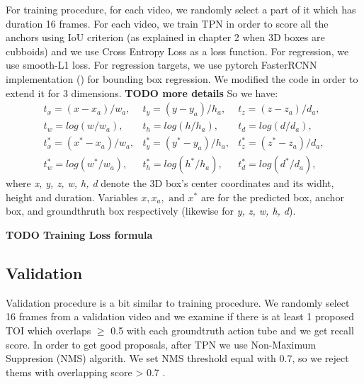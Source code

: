 \documentclass{report}
\begin{document}
For training procedure, for each video, we randomly select a part of it which has duration 16 frames. For each video, we train TPN in
order to score all the anchors using IoU criterion (as explained in chapter 2 when 3D boxes are cubboids) and we use Cross Entropy Loss as a loss function.
For regression, we use smooth-L1 loss. For regression targets, we use pytorch FasterRCNN implementation (\cite{jjfaster2rcnn}) for bounding box regression.
We modified the code in order to extend it for 3 dimensions. \textbf{TODO more details}
So we have:
\[ \begin{matrix}
    t_x = (x-x_a)/w_a, & t_y = (y-y_a)/h_a, & t_z= (z-z_a)/d_a, \\
    t_w= log(w/w_a), & t_h= log(h/h_a), & t_d = log(d/d_a), \\
    t^*_x = (x^* - x_a)/w_a, & t^*_y = (y^* - y_a)/h_a, & t^*_z = (z^* - z_a)/d_a, \\
    t^*_w = log(w^* /w_a), & t^*_h = log(h^*/h_a), & t^*_d = log(d^*/d_a),
  \end{matrix}
\]
where \textit{x, y, z, w, h, d} denote the 3D box's center coordinates and its widht, height and duration. Variables $x, x_a, \text{ and } x^*$
are for the predicted box, anchor box, and groundthruth box respectively (likewise for \textit{y, z, w, h, d}). \par

\textbf{TODO Training Loss formula}

\subsection{Validation}

Validation procedure is a bit similar to training procedure.
We randomly select 16 frames from a validation video and we examine if there is at least 1 proposed TOI
which overlaps $\ge$ 0.5 with each groundtruth action tube and we get recall score. 
In order to get good proposals, after TPN we use Non-Maximum Suppresion (NMS) algorith. We set NMS threshold equal with 0.7, so we reject
thems with overlapping score > 0.7 .
\end{document}
